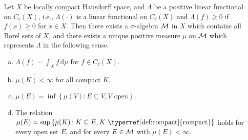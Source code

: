 \begin{theorem}\label{thm:lec27}
	Let \(X\) be \hyperref[def:locally-compact]{locally compact} \hyperref[def:Hausdorff]{Hausdorff} space, and \(\Lambda \) be a positive linear functional on \(C_c(X)\), i.e., \(\Lambda (\cdot)\) is a linear functional on \(C_c(X)\) and \(\Lambda (f) \geq 0\) if \(f(x) \geq 0\) for \(x\in X\). Then there exists a \(\sigma \)-algebra \(\mathcal{\MakeUppercase{m}} \) in \(X\) which contains all Borel sets of \(X\), and there exists a unique positive measure \(\mu \) on \(\mathcal{\MakeUppercase{m}} \) which represents \(\Lambda \) in the following sense.
	\begin{enumerate}[(a)]
		\item \(\Lambda (f) = \int _X f\,\mathrm{d} \mu \) for \(f\in C_c(X)\).
		\item \(\mu (K) < \infty \) for all \hyperref[def:compact]{compact} \(K\).
		\item \(\mu (E) = \inf \left\{ \mu (V) \colon E \subseteq V, V\text{ open} \right\} \).
		\item The relation \(\mu (E) = \sup \left\{ \mu (K) \colon K \subseteq E, K \text{ \hyperref[def:compact]{compact}}  \right\} \) holds for every open set \(E\), and for every \(E \in \mathcal{\MakeUppercase{m}} \) with \(\mu (E) < \infty \).
	\end{enumerate}
\end{theorem}
